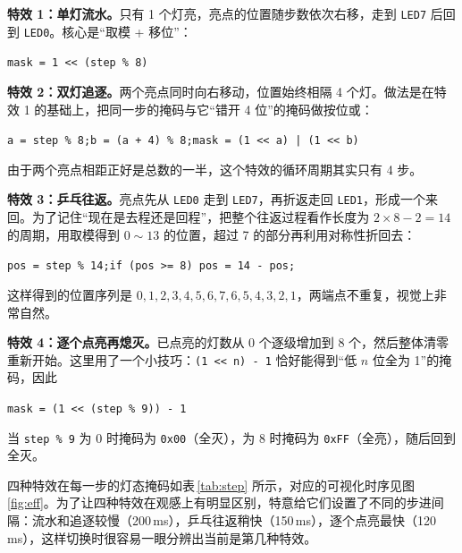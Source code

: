 \documentclass[UTF8,zihao=5,fontset=fandol]{ctexart}
\begin{document}
\begin{reportsection}{\MethodTitle}{\MethodHint}
  \textbf{特效 1：单灯流水。}只有 1 个灯亮，亮点的位置随步数依次右移，走到 \texttt{LED7} 后回到 \texttt{LED0}。核心是“取模 + 移位”：

  \begin{center}
  \texttt{mask = 1 << (step \% 8)}
  \end{center}

  \textbf{特效 2：双灯追逐。}两个亮点同时向右移动，位置始终相隔 4 个灯。做法是在特效 1 的基础上，把同一步的掩码与它“错开 4 位”的掩码做按位或：

  \begin{center}
  \texttt{a = step \% 8;\qquad b = (a + 4) \% 8;\qquad mask = (1 << a) | (1 << b)}
  \end{center}

  \noindent 由于两个亮点相距正好是总数的一半，这个特效的循环周期其实只有 4 步。

  \textbf{特效 3：乒乓往返。}亮点先从 \texttt{LED0} 走到 \texttt{LED7}，再折返走回 \texttt{LED1}，形成一个来回。为了记住“现在是去程还是回程”，把整个往返过程看作长度为 $2 \times 8 - 2 = 14$ 的周期，用取模得到 $0 \sim 13$ 的位置，超过 7 的部分再利用对称性折回去：

  \begin{center}
  \texttt{pos = step \% 14;\qquad if (pos >= 8)\ pos = 14 - pos;}
  \end{center}

  \noindent 这样得到的位置序列是 $0,1,2,3,4,5,6,7,6,5,4,3,2,1$，两端点不重复，视觉上非常自然。

  \textbf{特效 4：逐个点亮再熄灭。}已点亮的灯数从 0 个逐级增加到 8 个，然后整体清零重新开始。这里用了一个小技巧：\texttt{(1 << n) - 1} 恰好能得到“低 $n$ 位全为 1”的掩码，因此

  \begin{center}
  \texttt{mask = (1 << (step \% 9)) - 1}
  \end{center}

  \noindent 当 \texttt{step \% 9} 为 0 时掩码为 \texttt{0x00}（全灭），为 8 时掩码为 \texttt{0xFF}（全亮），随后回到全灭。

  四种特效在每一步的灯态掩码如表\,\ref{tab:step} 所示，对应的可视化时序见图\,\ref{fig:eff}。为了让四种特效在观感上有明显区别，特意给它们设置了不同的步进间隔：流水和追逐较慢（200\,ms），乒乓往返稍快（150\,ms），逐个点亮最快（120\,ms），这样切换时很容易一眼分辨出当前是第几种特效。


\end{reportsection}
\end{document}
